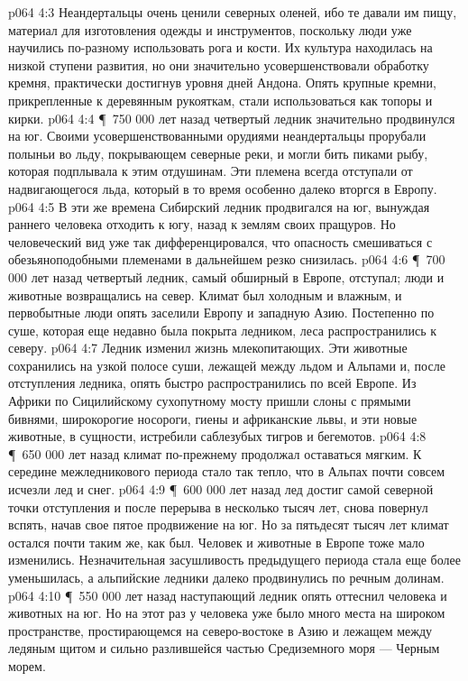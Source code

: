 \vs p064 4:3 Неандертальцы очень ценили северных оленей, ибо те давали им пищу, материал для изготовления одежды и инструментов, поскольку люди уже научились по\hyp{}разному использовать рога и кости. Их культура находилась на низкой ступени развития, но они значительно усовершенствовали обработку кремня, практически достигнув уровня дней Андона. Опять крупные кремни, прикрепленные к деревянным рукояткам, стали использоваться как топоры и кирки.
\vs p064 4:4 \P\ 750 000 лет назад четвертый ледник значительно продвинулся на юг. Своими усовершенствованными орудиями неандертальцы прорубали полыньи во льду, покрывающем северные реки, и могли бить пиками рыбу, которая подплывала к этим отдушинам. Эти племена всегда отступали от надвигающегося льда, который в то время особенно далеко вторгся в Европу.
\vs p064 4:5 В эти же времена Сибирский ледник продвигался на юг, вынуждая раннего человека отходить к югу, назад к землям своих пращуров. Но человеческий вид уже так дифференцировался, что опасность смешиваться с обезьяноподобными племенами в дальнейшем резко снизилась.
\vs p064 4:6 \P\ 700 000 лет назад четвертый ледник, самый обширный в Европе, отступал; люди и животные возвращались на север. Климат был холодным и влажным, и первобытные люди опять заселили Европу и западную Азию. Постепенно по суше, которая еще недавно была покрыта ледником, леса распространились к северу.
\vs p064 4:7 Ледник изменил жизнь млекопитающих. Эти животные сохранились на узкой полосе суши, лежащей между льдом и Альпами и, после отступления ледника, опять быстро распространились по всей Европе. Из Африки по Сицилийскому сухопутному мосту пришли слоны с прямыми бивнями, широкорогие носороги, гиены и африканские львы, и эти новые животные, в сущности, истребили саблезубых тигров и бегемотов.
\vs p064 4:8 \P\ 650 000 лет назад климат по\hyp{}прежнему продолжал оставаться мягким. К середине межледникового периода стало так тепло, что в Альпах почти совсем исчезли лед и снег.
\vs p064 4:9 \P\ 600 000 лет назад лед достиг самой северной точки отступления и после перерыва в несколько тысяч лет, снова повернул вспять, начав свое пятое продвижение на юг. Но за пятьдесят тысяч лет климат остался почти таким же, как был. Человек и животные в Европе тоже мало изменились. Незначительная засушливость предыдущего периода стала еще более уменьшилась, а альпийские ледники далеко продвинулись по речным долинам.
\vs p064 4:10 \P\ 550 000 лет назад наступающий ледник опять оттеснил человека и животных на юг. Но на этот раз у человека уже было много места на широком пространстве, простирающемся на северо\hyp{}востоке в Азию и лежащем между ледяным щитом и сильно разлившейся частью Средиземного моря --- Черным морем.

